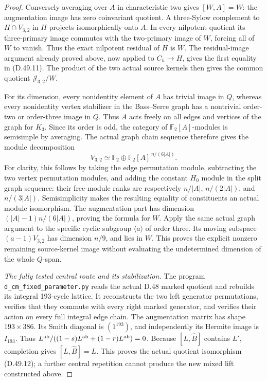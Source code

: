 \begin{proof}
Conversely averaging over \(A\) in characteristic
two gives \([W,A]=W\): the augmentation image
has zero coinvariant quotient. A three-Sylow
complement to \(H\cap V_{3,2}\) in \(H\)
projects isomorphically onto \(A\). In every
nilpotent quotient its three-primary image commutes
with the two-primary image of \(W\), forcing all
of \(W\) to vanish. Thus the exact nilpotent
residual of \(H\) is \(W\). The residual-image
argument already proved above, now applied to
\(C_h\to H\), gives the first equality in
(D.49.11). The product of the two actual source
kernels then gives the common quotient
\(\mathcal J_{3,2}/W\).

For its dimension, every nonidentity element of
\(A\) has trivial image in \(Q\), whereas every
nonidentity vertex stabilizer in the Bass--Serre
graph has a nontrivial order-two or order-three
image in \(Q\). Thus \(A\) acts freely on all
edges and vertices of the graph for \(K_3\).
Since its order is odd, the category of
\(\mathbb F_2[A]\)-modules is semisimple by
averaging. The actual graph chain sequence
therefore gives the module decomposition
\[
 V_{3,2}\simeq\mathbb F_2
          \oplus\mathbb F_2[A]^{\,n/(6|A|)}.
 \tag{D.49.15}
\]
For clarity, this follows by taking the edge
permutation module, subtracting the two vertex
permutation modules, and adding the constant
\(H_0\) module in the split graph sequence:
their free-module ranks are respectively
\(n/|A|\), \(n/(2|A|)\), and \(n/(3|A|)\).
Semisimplicity makes the resulting equality of
constituents an actual module isomorphism.
The augmentation part has dimension
\((|A|-1)n/(6|A|)\), proving the formula for
\(W\). Apply the same actual graph argument to
the specific cyclic subgroup \(\langle a\rangle\)
of order three. Its moving subspace
\((a-1)V_{3,2}\) has dimension \(n/9\), and lies
in \(W\). This proves the explicit nonzero
remaining source-kernel image without evaluating
the undetermined dimension of the whole \(Q\)-span.

\emph{The fully tested central route and its stabilization.}
The program \texttt{d\_cm\_fixed\_parameter.py}
reads the actual D.48 marked quotient and rebuilds
its integral 193-cycle lattice. It reconstructs
the two left generator permutations, verifies that
they commute with every right marked generator,
and verifies their action on every full integral
edge chain. The augmentation matrix has shape
\(193\times386\). Its Smith diagonal is
\((1^{193})\), and independently its Hermite
image is \(I_{193}\). Thus
\(L^{\rm ab}/((1-s)L^{\rm ab}+(1-r)L^{\rm ab})=0\).
Because \([L,\widehat B]\) contains \(L'\),
completion gives \([L,\widehat B]=L\).
This proves the actual quotient isomorphism
(D.49.12); a further central repetition cannot
produce the new mixed lift constructed above.
\end{proof}
